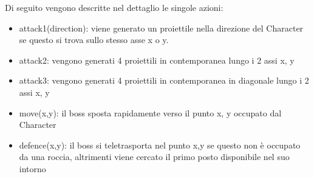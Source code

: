 Di seguito vengono descritte nel dettaglio le singole azioni:
\begin{itemize}
	\item attack1(direction): viene generato un proiettile nella direzione del Character se questo si trova sullo stesso asse x o y.
	\item attack2: vengono generati 4 proiettili in contemporanea lungo i 2 assi x, y
	\item attack3: vengono generati 4 proiettili in contemporanea in diagonale lungo i 2 assi x, y
	\item move(x,y): il boss sposta rapidamente verso il punto x, y occupato dal Character
	\item defence(x,y): il boss si teletrasporta nel punto x,y se questo non è occupato da una roccia, altrimenti viene cercato il primo posto disponibile nel suo intorno
\end{itemize}

